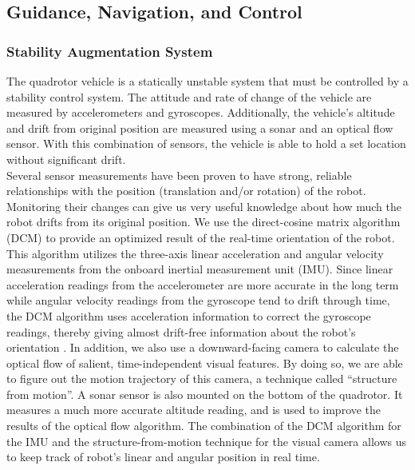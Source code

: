 \documentclass[12pt, letterpaper]{article}
\begin{document}
\subsection{Guidance, Navigation, and Control}
\subsubsection{Stability Augmentation System}

The quadrotor vehicle is a statically unstable system that must be controlled by a stability control system. The attitude and rate of change of the vehicle are measured by accelerometers and gyroscopes. Additionally, the vehicle's altitude and drift from original position are measured using a sonar and an optical flow sensor. With this combination of sensors, the vehicle is able to hold a set location without significant drift.
\vspace{1.0em}\\
Several sensor measurements have been proven to have strong, reliable relationships with the position (translation and/or rotation) of the robot. Monitoring their changes can give us very useful knowledge about how much the robot drifts from its original position. We use the direct-cosine matrix algorithm (DCM) to provide an optimized result of the real-time orientation of the robot. This algorithm utilizes the three-axis linear acceleration and angular velocity measurements from the onboard inertial measurement unit (IMU). Since linear acceleration readings from the accelerometer are more accurate in the long term while angular velocity readings from the gyroscope tend to drift through time, the DCM algorithm uses acceleration information to correct the gyroscope readings, thereby giving almost drift-free information about the robot's orientation \cite{bib:dcm}. In addition, we also use a downward-facing camera to calculate the optical flow of salient, time-independent visual features. By doing so, we are able to figure out the motion trajectory of this camera, a technique called ``structure from motion''. A sonar sensor is also mounted on the bottom of the quadrotor. It measures a much more accurate altitude reading, and is used to improve the results of the optical flow algorithm. The combination of the DCM algorithm for the IMU and the structure-from-motion technique for the visual camera allows us to keep track of robot's linear and angular position in real time.
\end{document}
